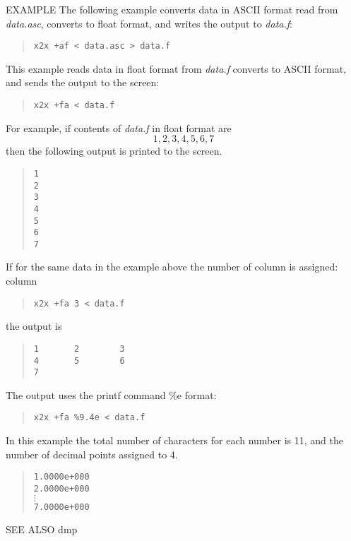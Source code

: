 \begin{qsection}{EXAMPLE}
The following example converts data in ASCII format
read from {\em data.asc}, converts to float format,
and writes the output to {\em data.f}:
\begin{quote}
  \verb!x2x +af < data.asc > data.f!
\end{quote}
\par
This example reads data in float format from {\em data.f}
converts to ASCII format, and sends the output to the screen:
\begin{quote}
  \verb!x2x +fa < data.f!
\end{quote}
For example, if contents of {\em data.f} in float format are
\begin{displaymath}
  1, 2, 3, 4, 5, 6, 7
\end{displaymath}
then the following output is printed to the screen.
\begin{quote}
  \verb!1! \\
  \verb!2! \\
  \verb!3! \\
  \verb!4! \\
  \verb!5! \\
  \verb!6! \\
  \verb!7!
\end{quote}
\par
If for the same data in the example above
the number of column is assigned:
column
\begin{quote}
  \verb!x2x +fa 3 < data.f!
\end{quote}
the output is
\begin{quote}
  \verb!1       2        3! \\
  \verb!4       5        6! \\
  \verb!7!
\end{quote}
\par
The output uses the printf command \%e format:
\begin{quote}
  \verb!x2x +fa %9.4e < data.f!
\end{quote}
In this example the total number of characters for each number
is 11, and the number of decimal points assigned to 4.
\begin{quote}
  \verb!1.0000e+000! \\
  \verb!2.0000e+000! \\
  \mbox{\hspace{2em}}$\vdots$ \\
  \verb!7.0000e+000!
\end{quote}
\end{qsection}

\begin{qsection}{SEE ALSO}
dmp
\end{qsection}
